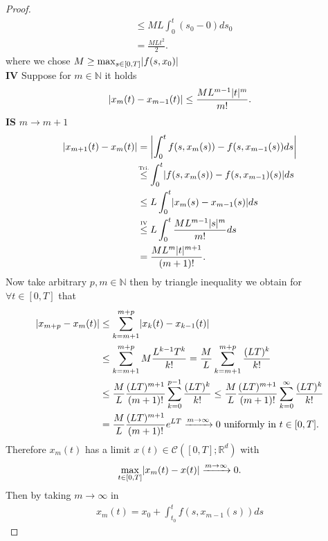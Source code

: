 \begin{proof}
\begin{align*}
                           &\le ML \int_0^{t}(s_{0}-0)  ds_{0} \\
                           &= \frac{MLt^2}{2}
 .\end{align*}
 where we chose $M \ge  \max_{s \in  [0,T]} \lvert f(s,x_{0})\rvert$ \\
 \textbf{IV} Suppose for $m \in  \mathbb{N}$ it holds 
 \begin{align*}
   \lvert x_m(t)-x_{m-1}(t)\rvert \le  \frac{ML^{m-1}\lvert t\rvert^m }{m!}
 .\end{align*}
 \textbf{IS} $m \to  m+1$ 
 \begin{align*}
   \abs{x_{m+1}(t)-x_m(t)}&= \abs*{\int_0^{t} f(s,x_m(s)) - f(s,x_{m-1}(s)) ds }\\
                          &\myS{Tri.}{\le }  \int_0^{t} \abs{f(s,x_m(s))-f(s,x_{m-1})(s)} ds \\
                          &\le L \int_0^{t} \abs{x_m(s) - x_{m-1}(s)}   ds \\
                          &\myS{IV}{\le } L \int_0^{t} \frac{ML^{m-1}\abs{s}^{m}  }{m!}  ds\\
                          &= \frac{ML^{m}\abs{t}^{m+1} }{(m+1)!}
 .\end{align*}
 Now take arbitrary $p,m \in  \mathbb{N}$  then by triangle inequality we obtain for $\forall  t \in  [0,T]$ that 
 \begin{align*}
   \lvert x_{m+p} - x_{m}(t)\rvert &\le  \sum_{k=m+1}^{m+p}  \lvert x_k(t) - x_{k-1}(t)\rvert \\
                            &\le \sum_{k=m+1}^{m+p} M \frac{L^{k-1}T^{k}  }{k!} 
                            = \frac{M}{L} \sum_{k=m+1}^{m+p} \frac{(LT)^{k} }{k!}\\ 
                            &\le \frac{M}{L} \frac{(LT)^{m+1} }{(m+1)!} \sum_{k=0}^{p-1}\frac{(LT)^{k} }{k!} 
                            \le \frac{M}{L}\frac{(LT)^{m+1} }{(m+1)!}\sum_{k=0}^{\infty} \frac{(LT)^{k} }{k!} \\
                                                      &= \frac{M}{L}\frac{(LT)^{m+1} }{(m+1)!} e^{LT} \xrightarrow{m\to \infty} 0 \text{ uniformly in } t\in [0,T]
 .\end{align*}
 Therefore $x_m(t)$ has a limit $x(t) \in  \mathcal{C}([0,T];\mathbb{R}^{d} ) $ with 
 \begin{align*}
   \max_{t \in  [0,T]} \lvert x_m(t) - x(t)\rvert \xrightarrow{m\to \infty} 0
 .\end{align*}
 Then by taking $m\to \infty$ in 
 \begin{align*}
   x_m(t) = x_{0} + \int_{t_{0}}^{t} f(s,x_{m-1}(s)) ds

\end{align*}
\end{proof}
